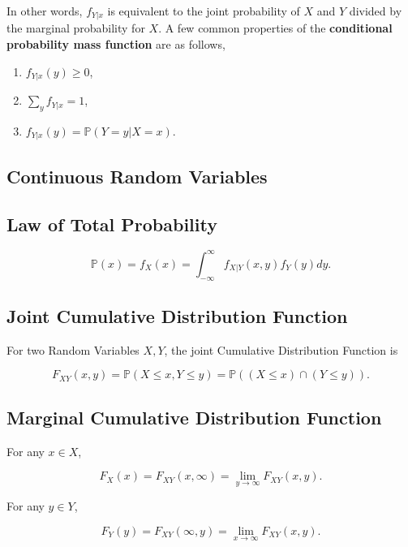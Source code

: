 \documentclass[12pt]{article}
\newcommand{\prob}[1]{\mathbb{P}(#1)}
\begin{document}
\noindent
In other words, $f_{Y \lvert x}$ is equivalent to the joint probability of $X$ and $Y$ divided by the marginal probability for $X$. A few common properties of the \textbf{conditional probability mass function} are as follows,

\begin{enumerate}
\item $f_{Y \lvert x}(y) \geq 0$,
\item $\sum_{y} f_{Y \lvert x} = 1$,
\item $f_{Y \lvert x}(y) = \prob{Y = y \lvert X = x}$.
\end{enumerate}

\subsection*{Continuous Random Variables}

\subsection*{Law of Total Probability}
\begin{equation*}
\prob{x} = f_X(x) = \int_{- \infty}^{\infty} f_{X \lvert Y} (x, y) f_Y(y) dy.
\end{equation*}

\subsection*{Joint Cumulative Distribution Function}
\noindent
For two Random Variables $X,Y$, the joint Cumulative Distribution Function is

\begin{equation*}
F_{XY}(x,y) = \prob{X \leq x, Y \leq y} = \prob{ (X \leq x) \cap (Y \leq y)}. 
\end{equation*}

\subsection*{Marginal Cumulative Distribution Function}
\noindent
For any $x \in X$,

\begin{equation*}
F_X(x) = F_{XY}(x, \infty) = \lim_{y \rightarrow \infty} F_{XY}(x, y).
\end{equation*}

\noindent
For any $y \in Y$,

\begin{equation*}
F_Y(y) = F_{XY}(\infty, y) = \lim_{x \rightarrow \infty} F_{XY}(x, y).
\end{equation*}
\end{document}
